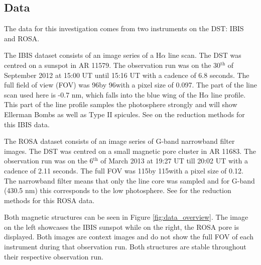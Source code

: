     \subsection{Data}
    
    The data for this investigation comes from two instruments on the DST: IBIS and ROSA.
    
    The IBIS dataset consists of an image series of a H$\alpha$ line scan.
    The DST was centred on a sunspot in AR 11579.
    The observation run was on the 30$^{\mathrm{th}}$ of September 2012 at 15:00 UT until 15:16 UT with a cadence of 6.8 seconds.
    The full field of view (FOV) was 96\arcsecs by 96\arcsecs with a pixel size of 0.097\arcsecs.
    The part of the line scan used here is -0.7 nm, which falls into the blue wing of the H$\alpha$ line profile.
    This part of the line profile samples the photosphere strongly and will show Ellerman Bombs as well as Type II spicules.
    See \cite{2013A&A...560A..31N} on the reduction methods for this IBIS data.

    The ROSA dataset consists of an image series of G-band narrowband filter images.
    The DST was centred on a small magnetic pore cluster in AR 11683.
    The observation run was on the 6$^{\mathrm{th}}$ of March 2013 at 19:27 UT till 20:02 UT with a cadence of 2.11 seconds.
    The full FOV was 115\arcsecs by 115\arcsecs with a pixel size of 0.12\arcsecs.
    The narrowband filter means that only the line core was sampled and for G-band (430.5 nm) this corresponds to the low photosphere.
    See \cite{0004-637X-806-1-132} for the reduction methods for this ROSA data.
    
    Both magnetic structures can be seen in Figure \ref{fig:data_overview}.
    The image on the left showcases the  IBIS sunspot while on the right, the ROSA pore is displayed.
    Both images are context images and do not show the full FOV of each instrument during that observation run.
    Both structures are stable throughout their respective observation run.

